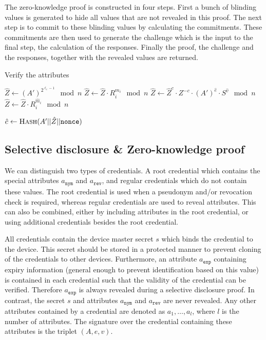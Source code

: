 The zero-knowledge proof is constructed in four steps. First a bunch of blinding
values is generated to hide all values that are not revealed in this proof. The
next step is to commit to these blinding values by calculating the commitments.
These commitments are then used to generate the challenge which is the input to
the final step, the calculation of the responses. Finally the proof, the
challenge and the responses, together with the revealed values are returned.


\begin{algorithm}
  \caption{Verify the attributes}
  \label{alg:verify}
  \addtolength{\baselineskip}{1.5mm}

  \begin{algorithmic}[1]
      \State $\hat{Z} \gets (A')^{2^{\ell_e - 1}} \mod n$
        \State $\hat{Z} \gets \hat{Z} \cdot R_i^{m_i} \mod n$
      \EndFor
      \State $\hat{Z} \gets \hat{Z}^c \cdot Z^{-c} \cdot (A')^{\hat{e}} \cdot S^{\hat{v}} \mod n$
        \State $\hat{Z} \gets \hat{Z} \cdot R_i^{\hat{m}_i} \mod n$
      \EndFor

      \State $\hat{c} \gets \Call{Hash}{A' || \hat{Z} || \mathtt{nonce}}$

        \Return {}
      \EndIf
      \Return {}
    \EndFunction
  \end{algorithmic}
\end{algorithm}


\subsection{Selective disclosure \& Zero-knowledge proof}

We can distinguish two types of credentials. A root credential which contains the special attributes $a_\mathtt{nym}$ and $a_\mathtt{rev}$, and regular credentials which do not contain these values. The root credential is used when a pseudonym and/or revocation check is required, whereas regular credentials are used to reveal attributes. This can also be combined, either by including attributes in the root credential, or using additional credentials besides the root credential.

All credentials contain the device master secret $s$ which binds the credential to the device. This secret should be stored in a protected manner to prevent cloning of the credentials to other devices. Furthermore, an attribute $a_\mathtt{exp}$ containing expiry information (general enough to prevent identification based on this value) is contained in each credential such that the validity of the credential can be verified. Therefore $a_\mathtt{exp}$ is always revealed during a selective disclosure proof. In contrast, the secret $s$ and attributes $a_\mathtt{nym}$ and $a_\mathtt{rev}$ are never revealed. Any other attributes contained by a credential are denoted as $a_1, \dots, a_l$, where $l$ is the number of attributes. The signature over the credential containing these attributes is the triplet $(A, e, v)$.

